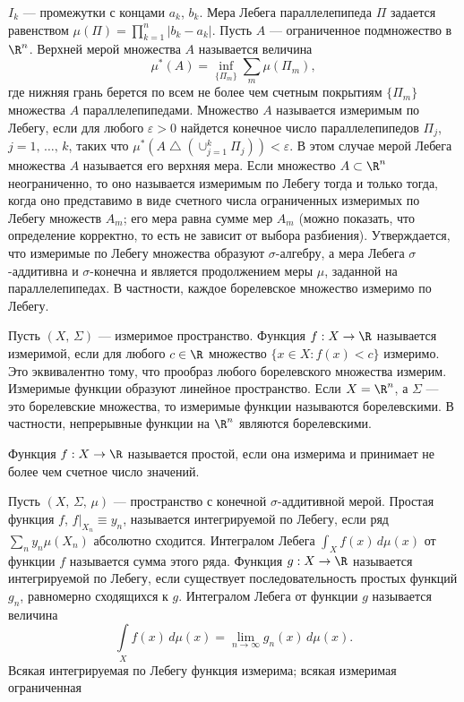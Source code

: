 \documentclass[a4paper
]{article}
\begin{document}
$I_k$ --- промежутки с концами $a_k$, $b_k$. Мера Лебега
параллелепипеда $\Pi$ задается равенством $\mu(\Pi)=\prod_{k=1}^n
|b_k-a_k|$. Пусть $A$ --- ограниченное подмножество в $\R^n$.
Верхней мерой множества $A$ называется величина $$\mu^*(A)=\inf
_{\{\Pi_m\}}\sum \limits_m \mu(\Pi_m),$$ где нижняя грань берется
по всем не более чем счетным покрытиям $\{\Pi_m\}$ множества $A$
параллелепипедами. Множество $A$ называется измеримым по Лебегу,
если для любого $\varepsilon>0$ найдется конечное число
параллелепипедов $\Pi_j$, $j=1, \, \dots, \, k$, таких что
$\mu^*\left(A\bigtriangleup \left(\cup_{j=1}^k \Pi_j\right)\right)
<\varepsilon$. В этом случае мерой Лебега множества $A$ называется
его верхняя мера. Если множество $A\subset \R^n$ неограниченно,
то оно называется измеримым по Лебегу тогда и только тогда, когда
оно представимо в виде счетного числа ограниченных измеримых по
Лебегу множеств $A_m$; его мера равна сумме мер $A_m$ (можно
показать, что определение корректно, то есть не зависит от выбора
разбиения). Утверждается, что измеримые по Лебегу множества
образуют $\sigma$-алгебру, а мера Лебега $\sigma$-аддитивна и
$\sigma$-конечна и является продолжением меры $\mu$, заданной
на параллелепипедах. В частности, каждое борелевское множество
измеримо по Лебегу. \par
Пусть $(X, \, \Sigma)$ --- измеримое пространство. Функция $f:
X\rightarrow \R$ называется измеримой, если для любого $c\in \R$
множество $\{x\in X:f(x)<c\}$ измеримо. Это эквивалентно тому, что
прообраз любого борелевского множества измерим. Измеримые
функции образуют линейное пространство. Если $X=\R^n$, а $\Sigma$
--- это борелевские множества, то измеримые функции называются
борелевскими. В частности, непрерывные функции на $\R^n$ являются
борелевскими. \par
Функция $f:X\rightarrow \R$ называется простой, если она измерима
и принимает не более чем счетное число значений. \par
Пусть $(X, \, \Sigma, \, \mu)$ --- пространство с конечной
$\sigma$-аддитивной мерой. Простая функция $f$, $f|_{X_n}\equiv y_n$,
называется интегрируемой по Лебегу, если ряд $\sum _n y_n\mu(X_n)$
абсолютно сходится. Интегралом Лебега $\int _X f(x)\, d\mu(x)$ от
функции $f$ называется сумма этого ряда. Функция $g:X\rightarrow \R$
называется интегрируемой по Лебегу, если существует последовательность
простых функций $g_n$, равномерно сходящихся к $g$. Интегралом Лебега
от функции $g$ называется величина $$\int \limits_X f(x)\, d\mu(x)=
\lim \limits_{n\rightarrow \infty} g_n(x)\, d\mu(x).$$ Всякая
интегрируемая по Лебегу функция измерима; всякая измеримая ограниченная
\end{document}
